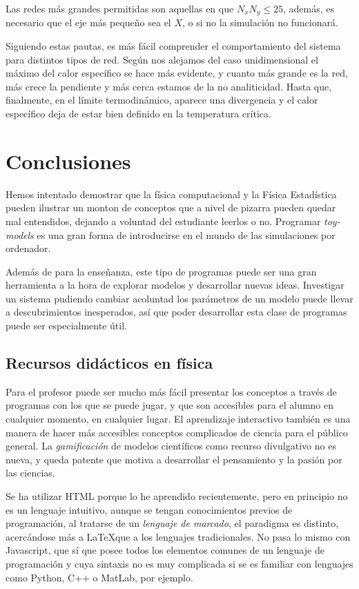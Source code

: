 \documentclass[11pt, a4paper]{article} %
\theoremstyle{named}
\begin{document}
Las redes más grandes permitidas son aquellas en que $N_x N_y \leq 25$, además, es necesario que el eje más pequeño sea el $X$, o si no la simulación no funcionará.

Siguiendo estas pautas, es más fácil comprender el comportamiento del sistema para distintos tipos de red. Según nos alejamos del caso unidimensional el máximo del calor específico se hace más evidente, y cuanto más grande es la red, más crece la pendiente y más cerca estamos de la no analiticidad. Hasta que, finalmente, en el límite termodinámico, aparece una divergencia y el calor específico deja de estar bien definido en la temperatura crítica.

\section{Conclusiones}\label{sec:conclusiones}

Hemos intentado demostrar que la física computacional y la Física Estadística pueden ilustrar un monton de conceptos que a nivel de pizarra pueden quedar mal entendidos, dejando a voluntad del estudiante leerlos o no.
Programar \textit{toy-models} es una gran forma de introducirse en el mundo de las simulaciones por ordenador.

Además de para la enseñanza, este tipo de programas puede ser una gran herramienta a la hora de explorar modelos y desarrollar nuevas ideas. Investigar un sistema pudiendo cambiar acoluntad los parámetros de un modelo puede llevar a descubrimientos inesperados, así que poder desarrollar esta clase de programas puede ser especialmente útil.

\subsection{Recursos didácticos en física}

Para el profesor puede ser mucho más fácil presentar los conceptos a través de programas con los que se puede jugar, y que son accesibles para el alumno en cualquier momento, en cualquier lugar.
El aprendizaje interactivo también es una manera de hacer más accesibles conceptos complicados de ciencia para el público general.
La \textit{gamificación} de modelos científicos como recurso divulgativo no es nueva, y queda patente que motiva a desarrollar el pensamiento y la pasión por las ciencias.

Se ha utilizar HTML porque lo he aprendido recientemente, pero en principio no es un lenguaje intuitivo, aunque se tengan conocimientos previos de programación, al tratarse de un \textit{lenguaje de marcado}, el paradigma es distinto, acercándose más a \LaTeX que a los lenguajes tradicionales. No pasa lo mismo con Javascript, que sí que posee todos los elementos comunes de un lenguaje de programación y cuya sintaxis no es muy complicada si se es familiar con lenguajes como Python, C++ o MatLab, por ejemplo.
\end{document}
